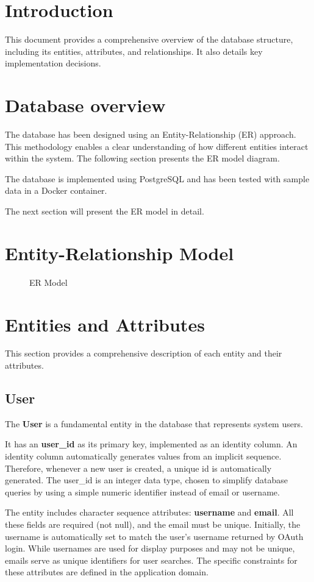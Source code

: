 \section{Introduction}
This document provides a comprehensive overview of the database structure, including its entities, attributes, and relationships. 
It also details key implementation decisions.

\section{Database overview}
The database has been designed using an Entity-Relationship (ER) approach.
This methodology enables a clear understanding of how different entities interact within the system. The following section presents the ER model diagram.

The database is implemented using PostgreSQL and has been tested with sample data in a Docker container.

The next section will present the ER model in detail.
\section{Entity-Relationship Model}
\begin{figure}[H]
    \centering
    
    \caption{ER Model}
    \label{fig:api_detailed_architecture}
\end{figure}

\section{Entities and Attributes}
This section provides a comprehensive description of each entity and their attributes.
\subsection{User}
The \textbf{User} is a fundamental entity in the database that represents system users.

It has an \textbf{user\_id} as its primary key, implemented as an identity column. An identity column automatically generates values from an implicit sequence.
Therefore, whenever a new user is created, a unique id is automatically generated. The user\_id is an integer data type, chosen to simplify database queries by using a simple numeric identifier instead of email or username.

The entity includes character sequence attributes: \textbf{username} and \textbf{email}. All these fields are required (not null), and the email must be unique.
Initially, the username is automatically set to match the user's username returned by OAuth login. While usernames are used for display purposes and may not be unique, emails serve as unique identifiers for user searches. The specific constraints for these attributes are defined in the application domain.

